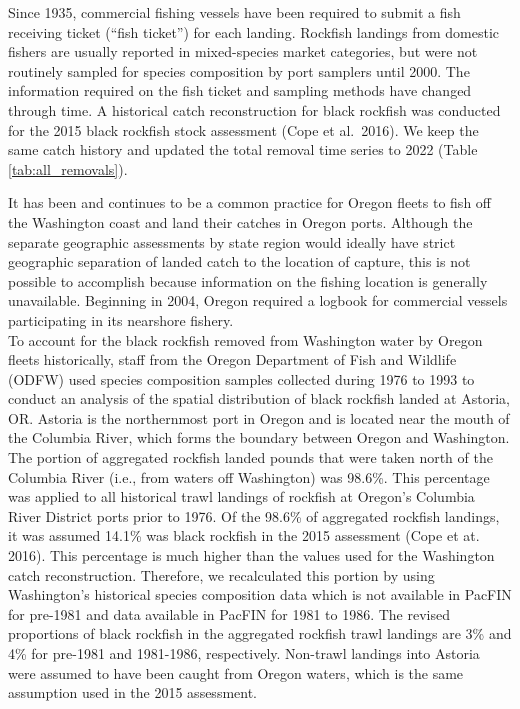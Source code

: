 \documentclass[11pt,
  english,
  letterpaper,
]{article}
\begin{document}
Since 1935, commercial fishing vessels have been required to submit a fish receiving ticket (``fish ticket'') for each landing. Rockfish landings from domestic fishers are usually reported in mixed-species market categories, but were not routinely sampled for species composition by port samplers until 2000. The information required on the fish ticket and sampling methods have changed through time. A historical catch reconstruction for black rockfish was conducted for the 2015 black rockfish stock assessment (Cope et al.~2016). We keep the same catch history and updated the total removal time series to 2022 (Table \ref{tab:all_removals}).

It has been and continues to be a common practice for Oregon fleets to fish off the Washington coast and land their catches in Oregon ports. Although the separate geographic assessments by state region would ideally have strict geographic separation of landed catch to the location of capture, this is not possible to accomplish because information on the fishing location is generally unavailable. Beginning in 2004, Oregon required a logbook for commercial vessels participating in its nearshore fishery.\\
To account for the black rockfish removed from Washington water by Oregon fleets historically, staff from the Oregon Department of Fish and Wildlife (ODFW) used species composition samples collected during 1976 to 1993 to conduct an analysis of the spatial distribution of black rockfish landed at Astoria, OR. Astoria is the northernmost port in Oregon and is located near the mouth of the Columbia River, which forms the boundary between Oregon and Washington. The portion of aggregated rockfish landed pounds that were taken north of the Columbia River (i.e., from waters off Washington) was 98.6\%. This percentage was applied to all historical trawl landings of rockfish at Oregon's Columbia River District ports prior to 1976. Of the 98.6\% of aggregated rockfish landings, it was assumed 14.1\% was black rockfish in the 2015 assessment (Cope et at. 2016). This percentage is much higher than the values used for the Washington catch reconstruction. Therefore, we recalculated this portion by using Washington's historical species composition data which is not available in PacFIN for pre-1981 and data available in PacFIN for 1981 to 1986. The revised proportions of black rockfish in the aggregated rockfish trawl landings are 3\% and 4\% for pre-1981 and 1981-1986, respectively. Non-trawl landings into Astoria were assumed to have been caught from Oregon waters, which is the same assumption used in the 2015 assessment.
\end{document}
